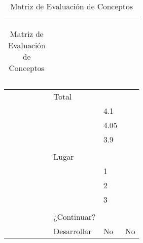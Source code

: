 \begin{table}[H]
\begin{tabularx}{\textwidth}{|l|X|X|X|}
\begin{tabular}{@{}p{0.9cm}|p{2.4cm}@{}}
    \end{tabular}
    \\
    \hline
    \begin{tabular}{@{}p{4cm}|p{1cm}@{}}
    & Total \\
    \end{tabular} 
    &
    \begin{tabular}{@{}p{0.9cm}|p{2.4cm}@{}}
     &   4.1\\
    \end{tabular}
    & 
    \begin{tabular}{@{}p{0.9cm}|p{2.4cm}@{}}
     &   4.05\\
    \end{tabular}
    & 
    \begin{tabular}{@{}p{0.9cm}|p{2.4cm}@{}}
     &  3.9\\
    \end{tabular}
    \\
    \hline
    \begin{tabular}{@{}p{4cm}|p{1cm}@{}}
    & Lugar \\
    \end{tabular} 
    &
    \begin{tabular}{@{}p{0.9cm}|p{2.4cm}@{}}
    &  1 \\
    \end{tabular}
    & 
    \begin{tabular}{@{}p{0.9cm}|p{2.4cm}@{}}
     & 2 \\
    \end{tabular}
    & 
    \begin{tabular}{@{}p{0.9cm}|p{2.4cm}@{}}
     & 3 \\
    \end{tabular}
    \\
    \hline
    \begin{tabular}{@{}p{1cm} p{2.5cm}@{}}
    & ¿Continuar? \\
    \end{tabular} 
    &
    Desarrollar
    & 
    No
    & 
    No
    \\
    \hline
    
\end{tabularx}
\caption{Matriz de Evaluación de Conceptos}
\label{tab:eval_conceptos}
\end{table}

